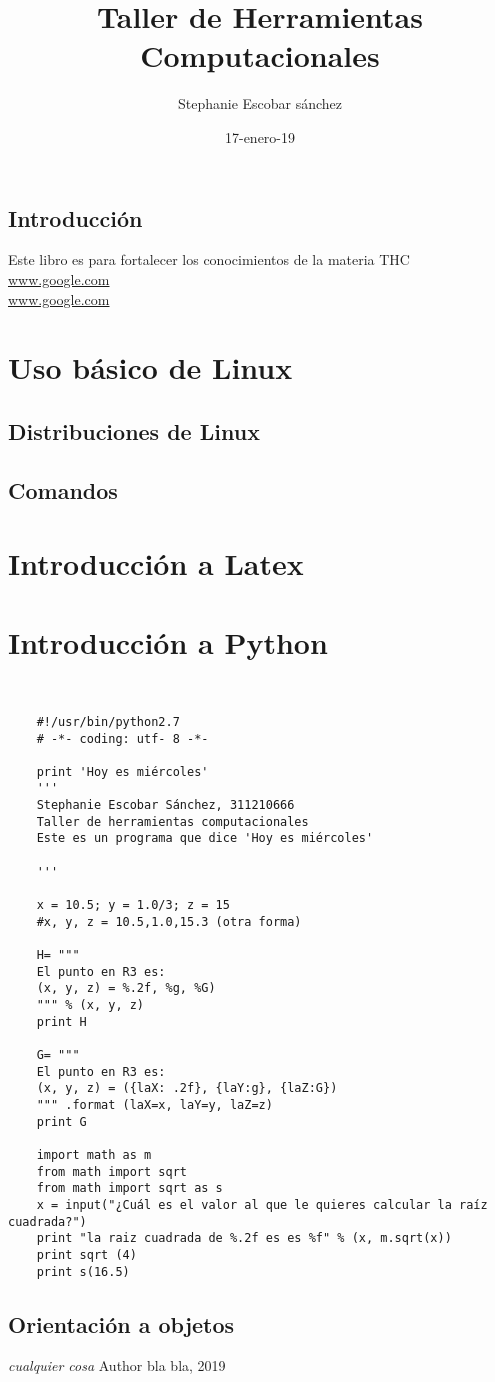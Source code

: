 \documentclass{book}
\title{Taller de Herramientas Computacionales}
\author{Stephanie Escobar sánchez}
\date{17-enero-19}
\begin{document}
	\maketitle
	\tableofcontents
	\section*{Introducción} Este libro es para fortalecer los conocimientos de la materia THC\\
	\url{www.google.com}\\
	\hyperref[Google]{www.google.com}

	\chapter{Uso básico de Linux}
	\section{Distribuciones de Linux}
	\section{Comandos}
	\chapter{Introducción a Latex}
	\chapter{Introducción a Python}
	\begin{verbatim}


	#!/usr/bin/python2.7
	# -*- coding: utf- 8 -*-
	
	print 'Hoy es miércoles'
	'''
	Stephanie Escobar Sánchez, 311210666
	Taller de herramientas computacionales
	Este es un programa que dice 'Hoy es miércoles'
	
	'''
	
	x = 10.5; y = 1.0/3; z = 15
	#x, y, z = 10.5,1.0,15.3 (otra forma)
	
	H= """
	El punto en R3 es:
	(x, y, z) = %.2f, %g, %G)
	""" % (x, y, z)
	print H
	
	G= """
	El punto en R3 es:
	(x, y, z) = ({laX: .2f}, {laY:g}, {laZ:G})
	""" .format (laX=x, laY=y, laZ=z)
	print G
	
	import math as m
	from math import sqrt
	from math import sqrt as s
	x = input("¿Cuál es el valor al que le quieres calcular la raíz cuadrada?")
	print "la raiz cuadrada de %.2f es es %f" % (x, m.sqrt(x))
	print sqrt (4)
	print s(16.5)
		\end{verbatim}
		
	\section*{Orientación a objetos}
	
	\begin{thebibliography}{9}
\textit{cualquier cosa}
		Author bla bla, 2019
	
	\end{thebibliography}
	
\end{document}
